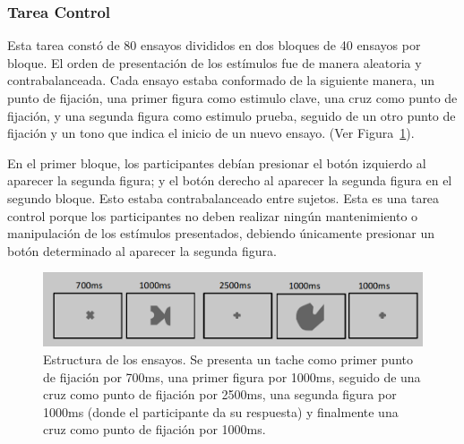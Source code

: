 \documentclass[12pt,letterpaper,final]{article}
\begin{document}
\subsubsection{Tarea Control}
Esta tarea constó de 80 ensayos divididos en dos bloques de 40 ensayos por bloque. El orden de presentación de los estímulos fue de manera aleatoria y contrabalanceada. Cada ensayo estaba conformado de la siguiente manera, un punto de fijación, una primer figura como estimulo clave, una cruz como punto de fijación, y una segunda figura como estimulo prueba, seguido de un otro punto de fijación y un tono que indica el inicio de un nuevo ensayo.
(Ver Figura~\ref{fig:EstruturaEnsayo}).


En el primer bloque, los participantes debían presionar el botón izquierdo al aparecer la segunda figura; y el botón derecho al aparecer la segunda figura en el segundo bloque. Esto estaba contrabalanceado entre sujetos. Esta es una tarea control porque los participantes no deben realizar ningún mantenimiento o manipulación de los estímulos presentados, debiendo únicamente presionar un botón determinado al aparecer la segunda figura.

\begin{figure}[ht]
	\centering
	\includegraphics[scale=0.5]{ensayoMT.png}
	\caption{Estructura de los  ensayos. Se presenta un tache como primer punto de fijación por 700ms, una primer figura por 1000ms, seguido de una cruz como punto de fijación por 2500ms, una segunda figura por 1000ms  (donde el participante da su respuesta) y finalmente una cruz como punto de fijación por 1000ms.}
	\label{fig:EstruturaEnsayo}
\end{figure}
\end{document}
